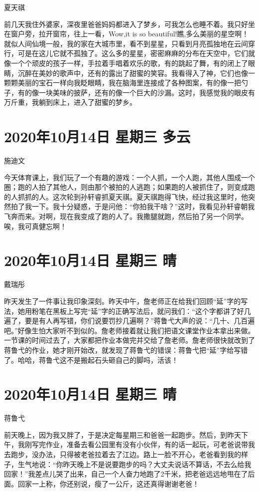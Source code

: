 夏天祺

前几天我住外婆家，深夜里爸爸妈妈都进入了梦乡，可我怎么也睡不着。我只好坐在窗户旁，拉开窗帘，往上一看，Wow,it
is so
beautiful!瞧,多么美丽的星空啊！就似人间仙境一般，我的家在大城市里，看不到星星，只看到月亮孤独地在云间穿行，可是在这儿它就不孤独了。这么多的星星，密密麻麻的分布在天空中，它们就像一个个顽皮的孩子一样，手拉着手唱着欢乐的歌，有的跳起了舞，有的闭上了眼睛，沉醉在美妙的歌声中，还有的露出了甜蜜的笑容。我看得入了神，它们也像一颗颗美丽的宝石一样向我眨眼睛，我在脑海里连接成了各种图案，有的像一把勺子，有的像一块美味的披萨，还有的像一个巨大的沙漏。这时，我感觉我的眼皮有万斤重，我躺到床上，进入了甜蜜的梦乡。

\section{2020年10月14日 星期三 多云}

施迪文

今天体育课上，我们玩了一个有趣的游戏：一个人抓，一个人跑，其他人围成一个圈；跑的人拍了其他人，则由那个被拍的人逃跑；如果跑的人被抓住了，则变成跑的人抓抓的人。这次轮到孙轩睿抓夏天祺。夏天祺跑得飞快，经过我这里时，他突然拍了我一下。我十分疑惑，于是问他：“你拍我干啥？”这时，我看见孙轩睿朝我飞奔而来。对啊，现在我变成了跑的人了。我撒腿就跑，然后拍了另一个同学。唉，我可真健忘啊！

\section{2020年10月14日 星期三 晴}

戴瑞彤

昨天发生了一件事让我印象深刻。昨天中午，詹老师正在给我们回顾“延”字的写法，她用粉笔在黑板上写完“延”字的正确写法后，就问我们：“这个字都讲了好几遍了，要是有人再写错，你们说要罚抄几遍啊？”蒋鲁弋大声的说：“几十、几百遍吧。”好像生怕大家听不到似的。詹老师接着就让我们把语文课堂作业本拿出来做。一节课的时间过去了，大家都把作业本做完并交给了詹老师。詹老师很快就改到了蒋鲁弋的作业，她才刚开始改，就发现了蒋鲁弋的错误：蒋鲁弋把“延”字给写错了。哈哈，蒋鲁弋这不是搬起石头砸自己的脚吗，活该！

\section{2020年10月14日 星期三 晴}

蒋鲁弋

前天晚上，因为我又胖了，于是决定每星期三和爸爸一起跑步。然后，到昨天下午，我刚写完作业，准备去看公园里有没有小伙伴，有的话一起玩，可老爸说带我去跑步，没办法，只得被老爸拉着去了江边。路上一脸不开心，老爸看到我的样子，生气地说：“你昨天晚上不是说要跑步的吗？大丈夫说话不算话，不去么给我回家！”我差点儿哭了出来，自己一个人奋力地跑了2千米，把老爸远远地甩在了后面。回家一上称，你还别说，瘦了一公斤，这还真得谢谢老爸！

